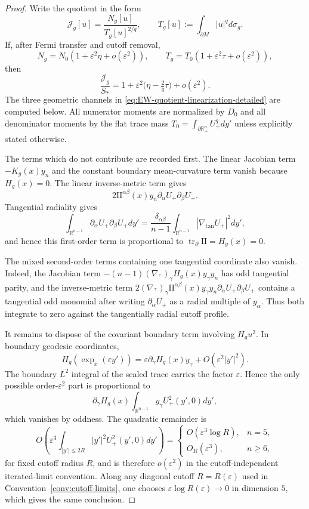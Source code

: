 \documentclass[11pt,reqno,a4paper]{amsart}
\newcommand{\R}{\mathbb{R}}
\numberwithin{equation}{section}
\theoremstyle{plain}
\theoremstyle{remark}
\theoremstyle{plain}
\begin{document}
\begin{proof}
Write the quotient in the form
\[
\mathcal J_g[u]=\frac{N_g[u]}{T_g[u]^{2/q}},
\qquad
T_g[u]:=\int_{\partial M}|u|^qd\sigma_g .
\]
If, after Fermi transfer and cutoff removal,
\[
N_g=N_0(1+\varepsilon^2\eta+o(\varepsilon^2)),
\qquad
T_g=T_0(1+\varepsilon^2\tau+o(\varepsilon^2)),
\]
then
\begin{equation}\label{eq:EW-quotient-linearization-detailed}
\frac{\mathcal J_g}{S_\ast}
=1+\varepsilon^2\bigl(\eta-\tfrac2q\tau\bigr)+o(\varepsilon^2).
\end{equation}
The three geometric channels in \eqref{eq:EW-quotient-linearization-detailed} are computed below.
All numerator moments are normalized by $D_0$ and all denominator moments by the flat trace mass
$T_0=\int_{\partial\R^n_+}U_+^qdy'$ unless explicitly stated otherwise.

The terms which do not contribute are recorded first.  The linear Jacobian term
$-K_g(x)y_n$ and the constant boundary mean-curvature term vanish because $H_g(x)=0$.
The linear inverse-metric term gives
\[
2\mathrm{II}^{\alpha\beta}(x)y_n\partial_\alpha U_+\partial_\beta U_+.
\]
Tangential radiality gives
\[
\int_{\R^{n-1}}
\partial_\alpha U_+\partial_\beta U_+dy'
=
\frac{\delta_{\alpha\beta}}{n-1}
\int_{\R^{n-1}}|\nabla_{\tan}U_+|^2dy',
\]
and hence this first-order term is proportional to
$\operatorname{tr}_{\partial}\mathrm{II}=H_g(x)=0$.

The mixed second-order terms containing one tangential coordinate also vanish.
Indeed, the Jacobian term
$-(n-1)(\nabla_{{}^\top})_\gamma H_g(x)y_\gamma y_n$ has odd tangential parity, and the inverse-metric term
$2(\nabla_{{}^\top})_\gamma\mathrm{II}^{\alpha\beta}(x)y_\gamma y_n
\partial_\alpha U_+\partial_\beta U_+$ contains a tangential odd monomial
after writing $\partial_\alpha U_+$ as a radial multiple of $y_\alpha$.
Thus both integrate to zero against the tangentially radial cutoff profile.

It remains to dispose of the covariant boundary term involving $H_g u^2$.
In boundary geodesic coordinates,
\[
H_g(\exp_x(\varepsilon y'))
=
\varepsilon\partial_\gamma H_g(x)y_\gamma
+O(\varepsilon^2|y'|^2).
\]
The boundary $L^2$ integral of the scaled trace carries the factor
$\varepsilon$.  Hence the only possible order-$\varepsilon^2$ part is
proportional to
\[
\partial_\gamma H_g(x)
\int_{\R^{n-1}} y_\gamma U_+^2(y',0)dy',
\]
which vanishes by oddness.  The quadratic remainder is
\[
O\left(
\varepsilon^3
\int_{|y'|\le 2R}|y'|^2U_+^2(y',0)dy'
\right)
=
\begin{cases}
O(\varepsilon^3\log R), & n=5,\\
O_R(\varepsilon^3), & n\ge6,
\end{cases}
\]
for fixed cutoff radius $R$, and is therefore $o(\varepsilon^2)$ in the
cutoff-independent iterated-limit convention.  Along any diagonal cutoff
$R=R(\varepsilon)$ used in Convention~\ref{conv:cutoff-limits}, one chooses
$\varepsilon\log R(\varepsilon)\to0$ in dimension $5$, which gives the same
conclusion.


\end{proof}
\end{document}
